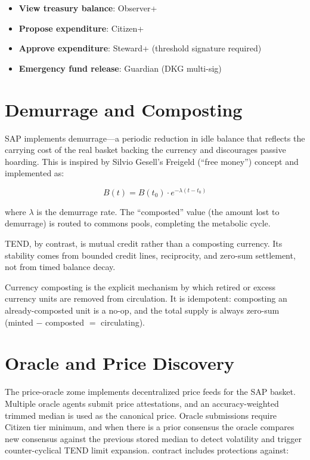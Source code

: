 \documentclass[12pt]{book}
\begin{document}
\begin{itemize}
  \item \textbf{View treasury balance}: Observer+
  \item \textbf{Propose expenditure}: Citizen+
  \item \textbf{Approve expenditure}: Steward+ (threshold signature required)
  \item \textbf{Emergency fund release}: Guardian (DKG multi-sig)
\end{itemize}

\section{Demurrage and Composting}

SAP implements demurrage---a periodic reduction in idle balance that reflects
the carrying cost of the real basket backing the currency and discourages
passive hoarding. This is inspired by Silvio Gesell's Freigeld (``free money'')
concept and implemented as:

\begin{equation}
  B(t) = B(t_0) \cdot e^{-\lambda (t - t_0)}
\end{equation}

where $\lambda$ is the demurrage rate. The ``composted'' value (the amount lost
to demurrage) is routed to commons pools, completing the metabolic cycle.

TEND, by contrast, is mutual credit rather than a composting currency. Its
stability comes from bounded credit lines, reciprocity, and zero-sum settlement,
not from timed balance decay.

Currency composting is the explicit mechanism by which retired or excess currency
units are removed from circulation. It is idempotent: composting an already-composted
unit is a no-op, and the total supply is always zero-sum (minted $-$ composted $=$
circulating).

\section{Oracle and Price Discovery}

The price-oracle zome implements decentralized price feeds for the SAP basket.
Multiple oracle agents submit price attestations, and an accuracy-weighted
trimmed median is used as the canonical price. Oracle submissions require
Citizen tier minimum, and when there is a prior consensus the oracle compares
new consensus against the previous stored median to detect volatility and
trigger counter-cyclical TEND limit expansion.
contract includes protections against:
\end{document}
